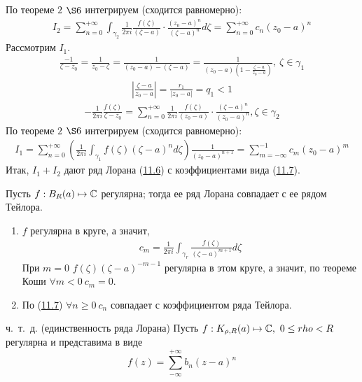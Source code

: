 \begin{enumerate}
    По теореме $2$ $\S 6$ интегрируем (сходится равномерно):
    \begin{align*}
      I_2 = \sum_{n=0}^{+\infty}\int_{\gamma_2} \frac{1}{2 \pi i}\frac{f(\zeta)}{(\zeta - a)}\cdot \frac{(z_0-a)^n}{(\zeta - a)^n} d\zeta = \sum_{n=0}^{+\infty} c_n(z_0-a)^n
    \end{align*}
    Рассмотрим $I_1$.
    \begin{align*}
      \frac{-1}{\zeta - z_0} = \frac{1}{z_0-\zeta} = \frac{1}{(z_0 - a) - (\zeta-a)} = \frac{1}{(z_0 - a)\left( 1 - \frac{\zeta-a}{z_0-a} \right)}, \ \zeta \in \gamma_1
    \end{align*}
    \begin{align*}
      \left| \frac{\zeta-a}{z_0 - a} \right| = \frac{r_1}{\left| z_0-a \right|} = q_1 < 1
    \end{align*}
    \begin{align*}
      -\frac{1}{2 \pi i}\frac{f(\zeta)}{\zeta - z_0} = \sum_{n=0}^{+\infty}\frac{1}{2\pi i}\frac{f(\zeta)}{(z_0 - a)} \cdot \frac{(\zeta-a)^n}{(z_0 - a)^n}, \zeta \in \gamma_2
    \end{align*}
    По теореме $2$ $\S 6$ интегрируем (сходится равномерно):
    \begin{align*}
      I_1 = \sum_{n=0}^{+\infty}\left( \frac{1}{2\pi i}\int_{\gamma_1}f(\zeta)(\zeta - a)^n d\zeta \right) \frac{1}{(z_0-a)^{n+1}} = \sum_{m = -\infty}^{-1}c_m(z_0-a)^m
    \end{align*}
    Итак, $I_1+I_2$ дают ряд Лорана (\href{(11.6)}{11.6}) с коэффициентами вида (\href{(11.7)}{11.7}).
\end{enumerate}
\corollary
Пусть $f: B_R(a) \mapsto \mathbb{C}$ регулярна; тогда ее ряд Лорана совпадает с ее
рядом Тейлора.
\pr
\begin{enumerate}
    \item $f$ регулярна в круге, а значит,
    \begin{align*}
      c_m = \frac{1}{2 \pi i}\int_{\gamma_r}\frac{f(\zeta)}{(\zeta - a)^{m+1}}d \zeta
    \end{align*}
    При $m = 0$ $f(\zeta)(\zeta - a)^{-m-1}$ регулярна в этом круге, а значит,
    по теореме Коши $\forall m < 0 \ c_m = 0$.
    \item По (\href{(11.7)}{11.7}) $\forall n \geq  0 \ c_n$ совпадает с
    коэффициентом ряда Тейлора.
\end{enumerate}
ч.~т.~д.
\theorem (единственность ряда Лорана)
Пусть $f:K_{\rho,R}(a) \mapsto \mathbb{C}, \ 0 \leq rho < R$ регулярна и представима в
виде
\begin{equation}\label{(11.8)}
  f(z) = \sum_{-\infty}^{+\infty} b_n(z-a)^n
\end{equation}
